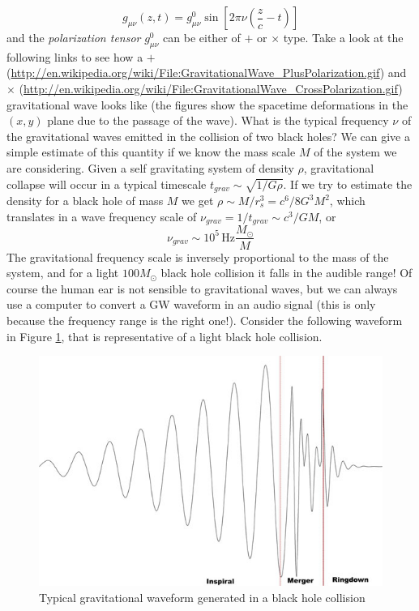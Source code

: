 \begin{equation}
g_{\mu\nu}(z,t) = g^0_{\mu\nu}\sin{\left[2\pi\nu\left(\frac{z}{c}-t\right)\right]}
\end{equation}
and the \textit{polarization tensor} $g^0_{\mu\nu}$ can be either of $+$ or $\times$ type. Take a look at the following links to see how a $+$ (\url{http://en.wikipedia.org/wiki/File:GravitationalWave_PlusPolarization.gif}) and $\times$ (\url{http://en.wikipedia.org/wiki/File:GravitationalWave_CrossPolarization.gif}) gravitational wave looks like (the figures show the spacetime deformations in the $(x,y)$ plane due to the passage of the wave). What is the typical frequency $\nu$ of the gravitational waves emitted in the collision of two black holes? We can give a simple estimate of this quantity if we know the mass scale $M$ of the system we are considering. Given a self gravitating system of density $\rho$, gravitational collapse will occur in a typical timescale $t_{grav}\sim\sqrt{1/G\rho}$. If we try to estimate the density for a black hole of mass $M$ we get $\rho\sim M/r_s^3 = c^6/8G^3M^2$, which translates in a wave frequency scale of $\nu_{grav} = 1/t_{grav} \sim c^3/GM$, or
\begin{equation}
\nu_{grav}\sim 10^5\,\mathrm{Hz}\frac{M_\odot}{M}
\end{equation}   
The gravitational frequency scale is inversely proportional to the mass of the system, and for a light $100M_\odot$ black hole collision it falls in the audible range! Of course the human ear is not sensible to gravitational waves, but we can always use a computer to convert a GW waveform in an audio signal (this is only because the frequency range is the right one!). Consider the following waveform in Figure \ref{waveform}, that is representative of a light black hole collision. 
\begin{figure}
\begin{center}
\includegraphics[scale=0.5]{Draw/GWwaveform.jpg}
\end{center}
\caption{Typical gravitational waveform generated in a black hole collision}
\label{waveform}
\end{figure}
